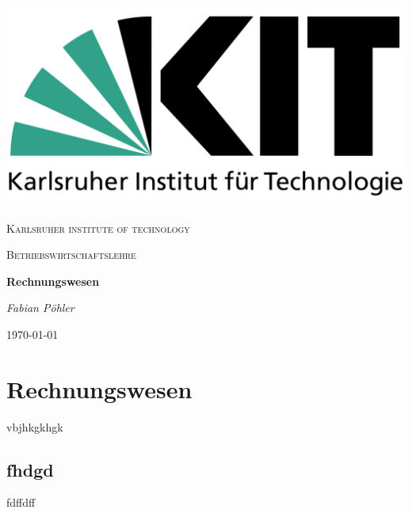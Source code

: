 \documentclass{article}
\begin{document}
\begin{titlepage}
	\centering
	\includegraphics[scale=0.1]{KIT.png} \par\vspace{4cm}
	{\scshape\LARGE Karlsruher institute of technology \par}
	\vspace{1cm}
	{\scshape\Large Betriebswirtschaftslehre\par}
	\vspace{1.5cm}
	{\huge\bfseries Rechnungswesen\par}
	\vspace{2cm}
	{\Large\itshape Fabian Pöhler\par}
	\vfill
	
	\vfill

	{\large \today\par}
\end{titlepage}
\newpage
\tableofcontents
\newpage

\section{Rechnungswesen}
vbjhkgkhgk

\subsection{fhdgd}

fdffdff
\end{document}
